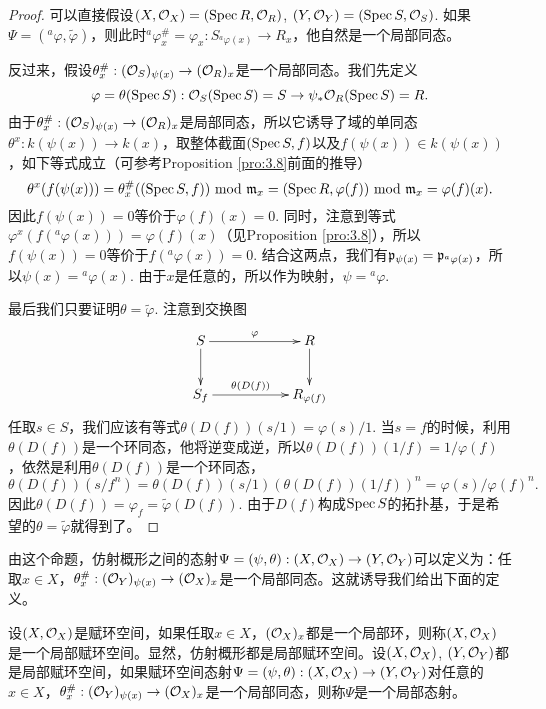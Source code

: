 \begin{proof}
可以直接假设$(X,\mathcal{O}_X)=(\operatorname{Spec} R,\mathcal{O}_R)$, $(Y,\mathcal{O}_Y)=(\operatorname{Spec} S,\mathcal{O}_S)$. 如果$\Psi=({}^a\varphi,\widetilde{\varphi})$，则此时${}^a\varphi^\#_x=\varphi_x:S_{{}^a\varphi(x)}\to R_x$，他自然是一个局部同态。

反过来，假设$\theta_x^\#:(\mathcal{O}_S)_{\psi(x)}\to (\mathcal{O}_R)_x$是一个局部同态。我们先定义
\[
	\varphi=\theta(\operatorname{Spec} S):\mathcal{O}_S(\operatorname{Spec} S)=S\to \psi_*\mathcal{O}_R(\operatorname{Spec} S)=R.
\]
由于$\theta_x^\#:(\mathcal{O}_S)_{\psi(x)}\to (\mathcal{O}_R)_x$是局部同态，所以它诱导了域的单同态$\theta^x:k(\psi(x))\to k(x)$，取整体截面$(\operatorname{Spec} S,f)$以及$f(\psi(x))\in k(\psi(x))$，如下等式成立（可参考Proposition \ref{pro:3.8}前面的推导）
\[
	\theta^x(f(\psi(x)))=\theta_x^\#((\operatorname{Spec} S,f))\,\, \text{mod}\,\, \mathfrak{m}_x=(\operatorname{Spec} R,\varphi(f)) \,\, \text{mod}\,\, \mathfrak{m}_x = \varphi(f)(x).
\]
因此$f(\psi(x))=0$等价于$\varphi(f)(x)=0$. 同时，注意到等式$\varphi^x(f({}^a\varphi(x)))=\varphi(f)(x)$（见Proposition \ref{pro:3.8}），所以$f(\psi(x))=0$等价于$f({}^a\varphi(x))=0$. 结合这两点，我们有$\mathfrak{p}_{\psi(x)}=\mathfrak{p}_{{}^a\varphi(x)}$，所以$\psi(x)={}^a\varphi(x)$. 由于$x$是任意的，所以作为映射，$\psi={}^a\varphi$.

最后我们只要证明$\theta=\widetilde{\varphi}$. 注意到交换图
\[
	\xymatrix{
	S\ar[d]\ar[rr]^-{\varphi}&&R\ar[d]\\
	S_{f}\ar[rr]^-{\theta(D(f))}&&R_{\varphi(f)}
	}
\]
任取$s\in S$，我们应该有等式$\theta(D(f))(s/1)=\varphi(s)/1$. 当$s=f$的时候，利用$\theta(D(f))$是一个环同态，他将逆变成逆，所以$\theta(D(f))(1/f)=1/\varphi(f)$，依然是利用$\theta(D(f))$是一个环同态，
\[
	\theta(D(f))(s/f^n)=\theta(D(f))(s/1)(\theta(D(f))(1/f))^n=\varphi(s)/\varphi(f)^n.
\]
因此$\theta(D(f))=\varphi_f=\widetilde{\varphi}(D(f))$. 由于$D(f)$构成$\operatorname{Spec} S$的拓扑基，于是希望的$\theta=\widetilde{\varphi}$就得到了。
\end{proof}

由这个命题，仿射概形之间的态射$\Psi=(\psi,\theta):(X,\mathcal{O}_X)\to (Y,\mathcal{O}_Y)$可以定义为：任取$x\in X$，$\theta_x^\#:(\mathcal{O}_Y)_{\psi(x)}\to (\mathcal{O}_X)_x$是一个局部同态。这就诱导我们给出下面的定义。

\begin{para}
设$(X,\mathcal{O}_X)$是赋环空间，如果任取$x\in X$，$(\mathcal{O}_X)_x$都是一个局部环，则称$(X,\mathcal{O}_X)$是一个局部赋环空间。显然，仿射概形都是局部赋环空间。设$(X,\mathcal{O}_X)$, $(Y,\mathcal{O}_Y)$都是局部赋环空间，如果赋环空间态射$\Psi=(\psi,\theta):(X,\mathcal{O}_X)\to (Y,\mathcal{O}_Y)$对任意的$x\in X$，$\theta_x^\#:(\mathcal{O}_Y)_{\psi(x)}\to (\mathcal{O}_X)_x$是一个局部同态，则称$\Psi$是一个局部态射。
\end{para}

